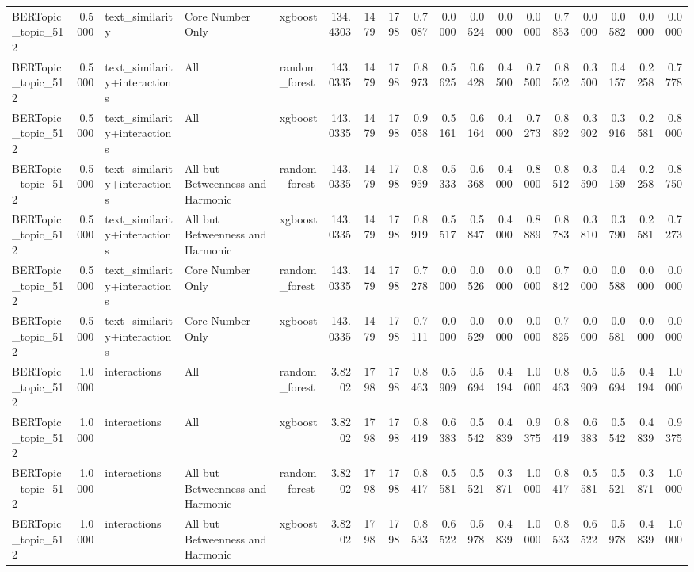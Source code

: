 \begin{tabular}{lrlllrrrrrrrrrrrrr}
BERTopic_topic_512 & 0.5000 & text_similarity & Core Number Only & xgboost & 134.4303 & 1479 & 1798 & 0.7087 & 0.0000 & 0.0524 & 0.0000 & 0.0000 & 0.7853 & 0.0000 & 0.0582 & 0.0000 & 0.0000 \\
BERTopic_topic_512 & 0.5000 & text_similarity+interactions & All & random_forest & 143.0335 & 1479 & 1798 & 0.8973 & 0.5625 & 0.6428 & 0.4500 & 0.7500 & 0.8502 & 0.3500 & 0.4157 & 0.2258 & 0.7778 \\
BERTopic_topic_512 & 0.5000 & text_similarity+interactions & All & xgboost & 143.0335 & 1479 & 1798 & 0.9058 & 0.5161 & 0.6164 & 0.4000 & 0.7273 & 0.8892 & 0.3902 & 0.3916 & 0.2581 & 0.8000 \\
BERTopic_topic_512 & 0.5000 & text_similarity+interactions & All but Betweenness and Harmonic & random_forest & 143.0335 & 1479 & 1798 & 0.8959 & 0.5333 & 0.6368 & 0.4000 & 0.8000 & 0.8512 & 0.3590 & 0.4159 & 0.2258 & 0.8750 \\
BERTopic_topic_512 & 0.5000 & text_similarity+interactions & All but Betweenness and Harmonic & xgboost & 143.0335 & 1479 & 1798 & 0.8919 & 0.5517 & 0.5847 & 0.4000 & 0.8889 & 0.8783 & 0.3810 & 0.3790 & 0.2581 & 0.7273 \\
BERTopic_topic_512 & 0.5000 & text_similarity+interactions & Core Number Only & random_forest & 143.0335 & 1479 & 1798 & 0.7278 & 0.0000 & 0.0526 & 0.0000 & 0.0000 & 0.7842 & 0.0000 & 0.0588 & 0.0000 & 0.0000 \\
BERTopic_topic_512 & 0.5000 & text_similarity+interactions & Core Number Only & xgboost & 143.0335 & 1479 & 1798 & 0.7111 & 0.0000 & 0.0529 & 0.0000 & 0.0000 & 0.7825 & 0.0000 & 0.0581 & 0.0000 & 0.0000 \\
BERTopic_topic_512 & 1.0000 & interactions & All & random_forest & 3.8202 & 1798 & 1798 & 0.8463 & 0.5909 & 0.5694 & 0.4194 & 1.0000 & 0.8463 & 0.5909 & 0.5694 & 0.4194 & 1.0000 \\
BERTopic_topic_512 & 1.0000 & interactions & All & xgboost & 3.8202 & 1798 & 1798 & 0.8419 & 0.6383 & 0.5542 & 0.4839 & 0.9375 & 0.8419 & 0.6383 & 0.5542 & 0.4839 & 0.9375 \\
BERTopic_topic_512 & 1.0000 & interactions & All but Betweenness and Harmonic & random_forest & 3.8202 & 1798 & 1798 & 0.8417 & 0.5581 & 0.5521 & 0.3871 & 1.0000 & 0.8417 & 0.5581 & 0.5521 & 0.3871 & 1.0000 \\
BERTopic_topic_512 & 1.0000 & interactions & All but Betweenness and Harmonic & xgboost & 3.8202 & 1798 & 1798 & 0.8533 & 0.6522 & 0.5978 & 0.4839 & 1.0000 & 0.8533 & 0.6522 & 0.5978 & 0.4839 & 1.0000 \\

\end{tabular}
